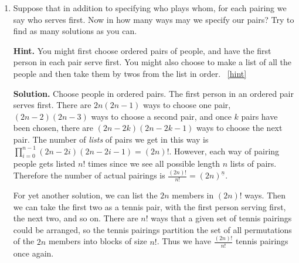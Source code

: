 \documentclass{book}
\begin{document}
\begin{activity}[]
\begin{enumerate}[font=\bfseries,label=(\alph*),ref=\alph*]
\item\label{task-149} \hypertarget{p-803}{}%
Suppose that in addition to specifying who plays whom, for each pairing we say who serves first.  Now in how many ways may we specify our pairs? Try to find as many solutions as you can.%
\par\smallskip%
\noindent\textbf{Hint.}\hypertarget{hint-68}{}\quad%
\hypertarget{p-804}{}%
You might first choose ordered pairs of people, and have the first person in each pair serve first. You might also choose to make a list of all the people and then take them by twos from the list in order.%
~\hfill{\tiny\hyperlink{a-112.b}{[hint]}\hypertarget{q-112.b}{}}\par\smallskip%
\noindent\textbf{Solution.}\hypertarget{solution-76}{}\quad%
\hypertarget{p-805}{}%
Choose people in ordered pairs.  The first person in an ordered pair serves first.  There are \(2n(2n-1)\) ways to choose one pair, \((2n-2)(2n-3)\) ways to choose a second pair, and once \(k\) pairs have been chosen, there are \((2n-2k)(2n-2k-1)\) ways to choose the next pair.  The number of \emph{lists} of pairs we get in this way is \(\prod_{i=0}^{n-1} (2n-2i)(2n-2i-1) = (2n)!\). However, each way of pairing people gets listed \(n!\) times since we see all possible length \(n\) lists of pairs.  Therefore the number of actual pairings is \(\frac{(2n)!}{n!} = (2n)^{\underline{n}}\).%
\par
\hypertarget{p-806}{}%
For yet another solution, we can list the \(2n\) members in \((2n)!\) ways. Then we can take the first two as a tennis pair, with the first person serving first, the next two, and so on. There are \(n!\) ways that a given set of tennis pairings could be arranged, so the tennis pairings partition the set of all permutations of the \(2n\) members into blocks of size \(n!\). Thus we have \(\frac{(2n)!}{n!}\) tennis pairings once again.%
\end{enumerate}
\end{activity}
\end{document}
